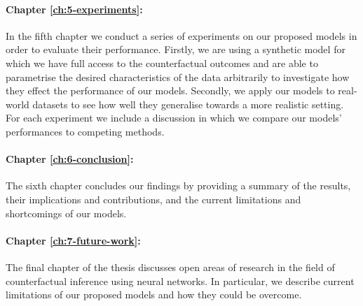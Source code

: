 \paragraph{Chapter \ref{ch:5-experiments}: }
In the fifth chapter we conduct a series of experiments on our proposed models in order to evaluate their performance. Firstly, we are using a synthetic model for which we have full access to the counterfactual outcomes and are able to parametrise the desired characteristics of the data arbitrarily to investigate how they effect the performance of our models. Secondly, we apply our models to real-world datasets to see how well they generalise towards a more realistic setting. For each experiment we include a discussion in which we compare our models' performances to competing methods.

\paragraph{Chapter \ref{ch:6-conclusion}: }
The sixth chapter concludes our findings by providing a summary of the results, their implications and contributions, and the current limitations and shortcomings of our models. 

\paragraph{Chapter \ref{ch:7-future-work}: }
The final chapter of the thesis discusses open areas of research in the field of counterfactual inference using neural networks. In particular, we describe current limitations of our proposed models and how they could be overcome. 
